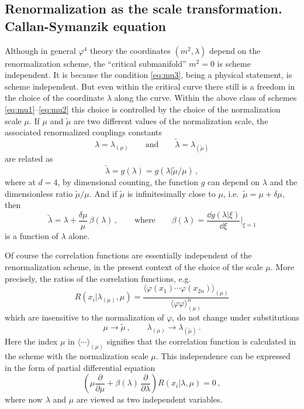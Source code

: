 \subsection*{Renormalization as the scale transformation. Callan-Symanzik equation}

Although in general $\varphi^4$ theory the coordinates $(m^2,\lambda)$ depend on
the renormalization scheme, the ``critical submanifold'' $m^2=0$ is scheme
independent. It is because the condition \eqref{eq:mu3}, being a physical
statement, is scheme independent. But even within the critical curve there still
is a freedom in the choice of the coordinate $\lambda$ along the curve. Within
the above class of schemes \eqref{eq:mu1}--\eqref{eq:mu2} this choice is
controlled by the choice of the normalization scale $\mu$. If $\mu$ and
$\tilde\mu$ are two different values of the normalization scale, the associated
renormalized couplings constants
\[
\lambda=\lambda_{(\mu)}\qquad\text{and}\qquad\tilde\lambda=\lambda_{(\tilde\mu)}
\]
are related as
\[
\tilde\lambda=g(\lambda)=g(\lambda|\tilde\mu/\mu)\,,
\]
where at $d=4$, by dimensional counting, the function $g$ can depend on
$\lambda$ and the dimensionless ratio $\tilde\mu/\mu$. And if $\tilde\mu$ is
infinitesimally close to $\mu$, i.e.\ $\tilde\mu=\mu+\delta\mu$, then
\[
\tilde\lambda=\lambda+\frac{\delta\mu}\mu\,\beta(\lambda)\,,\qquad\text{where}\qquad
\beta(\lambda)=\frac{\dd g(\lambda|\xi)}{\dd\xi}\Big|_{\xi=1}
\]
is a function of $\lambda$ alone.

Of course the correlation functions are essentially independent of the
renormalization scheme, in the present context of the choice of the scale $\mu$.
More precisely, the ratios of the correlation functions, e.g.
\begin{equation}\label{eq:Rratio}
R(x_i|\lambda_{(\mu)},\mu)=\frac{\bigl\langle\varphi(x_1)\cdots\varphi(x_{2n})\bigr\rangle_{(\mu)}}{\langle\varphi\varphi\rangle^n_{(\mu)}}
\end{equation}
which are insensitive to the normalization of $\varphi$, do not change under
substitutions
\[
\mu\to\tilde\mu\,,\qquad\lambda_{(\mu)}\to\lambda_{(\tilde\mu)}\,.
\]
Here the index $\mu$ in $\langle\cdots\rangle_{(\mu)}$ signifies that the
correlation function is calculated in the scheme with the normalization scale
$\mu$. This independence can be expressed in the form of partial differential
equation
\[
\left(\mu\frac\partial{\partial\mu}+\beta(\lambda)\,\frac\partial{\partial\lambda}\right)R(x_i|\lambda,\mu)=0\,,
\]
where now $\lambda$ and $\mu$ are viewed as two independent variables.

